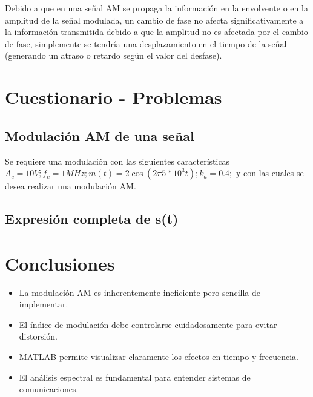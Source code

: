 \documentclass[conference]{IEEEtran}
\begin{document}
	Debido a que en una señal AM se propaga la información en la envolvente o en la amplitud de la señal modulada, un cambio de fase no afecta significativamente a la información transmitida debido a que la amplitud no es afectada por el cambio de fase, simplemente se tendría una desplazamiento en el tiempo de la señal (generando un atraso o retardo según el valor del desfase).
	
	\section{Cuestionario - Problemas}
	
	\subsection{\textbf{Modulación AM de una señal}}
	Se requiere una modulación con las siguientes características $A_c = 10V; f_c = 1MHz; m(t) = 2\cos(2\pi5*10^3t); k_a = 0.4;$ y con las cuales se desea realizar una modulación AM.
	\subsection{\textbf{Expresión completa de s(t)}}
	
	
	\section{Conclusiones}
	
	\begin{itemize}
		\item La modulación AM es inherentemente ineficiente pero sencilla de implementar.
		\item El índice de modulación debe controlarse cuidadosamente para evitar distorsión.
		\item MATLAB permite visualizar claramente los efectos en tiempo y frecuencia.
		\item El análisis espectral es fundamental para entender sistemas de comunicaciones.
	\end{itemize}
	
	
	
\end{document}
